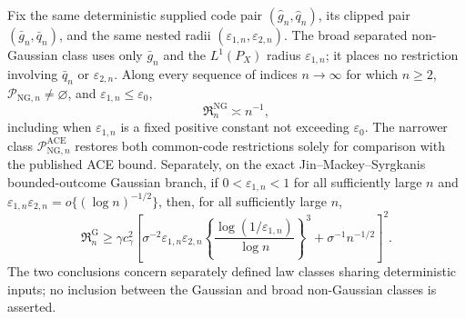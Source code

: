 Fix the same deterministic supplied code pair \((\widehat g_n,\widehat q_n)\), its clipped pair \((\bar g_n,\bar q_n)\), and the same nested radii \((\varepsilon_{1,n},\varepsilon_{2,n})\). The broad separated non-Gaussian class uses only \(\bar g_n\) and the \(L^1(P_X)\) radius \(\varepsilon_{1,n}\); it places no restriction involving \(\bar q_n\) or \(\varepsilon_{2,n}\). Along every sequence of indices \(n\to\infty\) for which \(n\ge2\), \(\mathcal P_{\mathrm{NG},n}\neq\varnothing\), and \(\varepsilon_{1,n}\le\varepsilon_0\),
\[
 \mathfrak R_n^{\mathrm{NG}}\asymp n^{-1},
\]
including when \(\varepsilon_{1,n}\) is a fixed positive constant not exceeding \(\varepsilon_0\). The narrower class \(\mathcal P_{\mathrm{NG},n}^{\mathrm{ACE}}\) restores both common-code restrictions solely for comparison with the published ACE bound. Separately, on the exact Jin--Mackey--Syrgkanis bounded-outcome Gaussian branch, if \(0<\varepsilon_{1,n}<1\) for all sufficiently large \(n\) and \(\varepsilon_{1,n}\varepsilon_{2,n}=o\{(\log n)^{-1/2}\}\), then, for all sufficiently large \(n\),
\[
 \mathfrak R_n^{\mathrm G}
 \ge\gamma c_{\gamma}^2
 \left[
  \sigma^{-2}\varepsilon_{1,n}\varepsilon_{2,n}
  \left\{\frac{\log(1/\varepsilon_{1,n})}{\log n}\right\}^3
  +\sigma^{-1}n^{-1/2}
 \right]^2.
\]
The two conclusions concern separately defined law classes sharing deterministic inputs; no inclusion between the Gaussian and broad non-Gaussian classes is asserted.